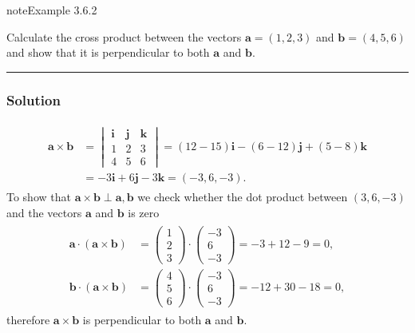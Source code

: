 \documentclass[letterpaper,10pt,english]{jupyterBook}
\begin{document}
\label{_pages/3.3_Dot_and_cross_products:cross-product-example}
\begin{sphinxadmonition}{note}{Example 3.6.2}



\sphinxAtStartPar
Calculate the cross product between the vectors \(\mathbf{a} = (1, 2, 3)\) and \(\mathbf{b} = (4, 5, 6)\) and show that it is perpendicular to both \(\mathbf{a}\) and \(\mathbf{b}\).


\bigskip\hrule\bigskip

\subsubsection*{Solution}
\begin{equation*}
\begin{split} \begin{align*}
    \mathbf{a} \times \mathbf{b} &= \begin{vmatrix} \mathbf{i} & \mathbf{j} & \mathbf{k} \\ 1 & 2 & 3 \\ 4 & 5 & 6 \end{vmatrix}
    = (12 - 15)\mathbf{i} - (6 - 12) \mathbf{j} + (5 - 8) \mathbf{k} \\
    &= -3\mathbf{i} + 6 \mathbf{j} - 3\mathbf{k}
    = (-3, 6, -3).
\end{align*} \end{split}
\end{equation*}
\sphinxAtStartPar
To show that \(\mathbf{a} \times \mathbf{b} \perp \mathbf{a}, \mathbf{b}\) we check whether the dot product between \((3, 6, -3)\) and the vectors \(\mathbf{a}\) and \(\mathbf{b}\) is zero
\begin{equation*}
\begin{split} \begin{align*}
    \mathbf{a} \cdot (\mathbf{a} \times \mathbf{b}) &= 
    \begin{pmatrix} 1 \\ 2 \\ 3 \end{pmatrix} \cdot
    \begin{pmatrix} -3 \\ 6 \\ -3 \end{pmatrix} 
    = -3 + 12 - 9 = 0, \\
    \mathbf{b} \cdot (\mathbf{a} \times \mathbf{b}) &=
    \begin{pmatrix} 4 \\ 5 \\ 6 \end{pmatrix} \cdot
    \begin{pmatrix} -3 \\ 6 \\ -3 \end{pmatrix}
    = -12 + 30 - 18 = 0,
\end{align*} \end{split}
\end{equation*}
\sphinxAtStartPar
therefore \(\mathbf{a} \times \mathbf{b}\) is perpendicular to both \(\mathbf{a}\) and \(\mathbf{b}\).
\end{sphinxadmonition}
\end{document}
